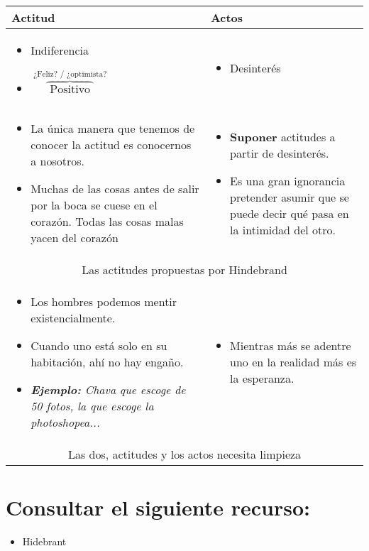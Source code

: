 \begin{center}
   \begin{center}
      \begin{tabular}{ | p{9cm} | p{9cm} | }
        \hline
            Actitud & Actos   \\
        \hline
            \begin{itemize}
                \item Indiferencia
                \item $\overbrace{\text{  Positivo  }}^{\text{  ¿Feliz? / ¿optimista? }}$
            \end{itemize} & 
            \begin{itemize}
                \item Desinterés
            \end{itemize}\\

            \begin{itemize}
                \item La única manera que tenemos de conocer la actitud es conocernos a nosotros.
                \item Muchas de las cosas antes de salir por la boca se cuese en el corazón. Todas las cosas malas yacen del corazón
            \end{itemize} & 
            \begin{itemize}
                \item \textbf{Suponer} actitudes a partir de desinterés.
                \item Es una gran ignorancia pretender asumir que se puede decir qué pasa en la intimidad del otro.
            \end{itemize} \\ 
            \multicolumn{2}{|c|}{Las actitudes propuestas por Hindebrand} \\ 
            \begin{itemize}
                \item Los hombres podemos mentir existencialmente.
                \item Cuando uno está solo en su habitación, ahí no hay engaño.
                \item \emph{\textbf{Ejemplo: }Chava que escoge de 50 fotos, la que escoge la photoshopea...}
            \end{itemize} & 
            \begin{itemize}
                \item Mientras más se adentre uno en la realidad más es la esperanza.
            \end{itemize} \\ 
            \multicolumn{2}{|c|}{Las dos, actitudes y los actos necesita limpieza  } \\ 
        \hline
      \end{tabular}
   \end{center}
\end{center}




\section{\textbf{Consultar el siguiente recurso:}}
\begin{itemize}
    \item Hidebrant
\end{itemize}

